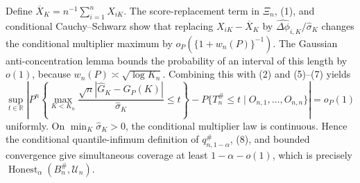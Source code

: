 Define \(\overline X_K=n^{-1}\sum_{i=1}^nX_{iK}\).  The score-replacement term in \(\Xi_n\), (1), and conditional Cauchy--Schwarz show that replacing \(X_{iK}-\overline X_K\) by \(\widehat{\Delta\phi}_{i,K}/\widehat\sigma_K\) changes the conditional multiplier maximum by \(o_P(\{1+w_n(P)\}^{-1})\).  The Gaussian anti-concentration lemma bounds the probability of an interval of this length by \(o(1)\), because \(w_n(P)\asymp\sqrt{\log K_n}\).  Combining this with (2) and (5)--(7) yields
\[
 \sup_{t\in\mathbb R}\left|
 P^n\!\left\{\max_{K<K_n}\frac{\sqrt n|\widehat G_K-G_P(K)|}{\widehat\sigma_K}\leq t\right\}
 -P\{T_n^{\#}\leq t\mid O_{n,1},\ldots,O_{n,n}\}
 \right|=o_P(1)                                                              \tag{8}
\]
uniformly.  On \(\min_K\widehat\sigma_K>0\), the conditional multiplier law is continuous.  Hence the conditional quantile-infimum definition of \(q_{n,1-\alpha}^{\#}\), (8), and bounded convergence give simultaneous coverage at least \(1-\alpha-o(1)\), which is precisely \(\operatorname{Honest}_{\alpha}(B_n^{\#},\mathcal U_n)\).


